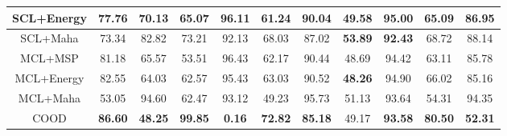 \begin{table*}[thb]
\begin{adjustbox}{width=0.9\textwidth}
\begin{tabular}{|ccccccccccc|}
\multicolumn{1}{|c|}{SCL+Energy}           & \multicolumn{1}{c|}{77.76}           & \multicolumn{1}{c|}{70.13}           & \multicolumn{1}{c|}{65.07}           & \multicolumn{1}{c|}{96.11}           & \multicolumn{1}{c|}{61.24}           & \multicolumn{1}{c|}{90.04}           & \multicolumn{1}{c|}{49.58}           & \multicolumn{1}{c|}{95.00}           & \multicolumn{1}{c|}{65.09}           & 86.95           \\ \hline
\multicolumn{1}{|c|}{SCL+Maha}             & \multicolumn{1}{c|}{73.34}           & \multicolumn{1}{c|}{82.82}           & \multicolumn{1}{c|}{73.21}           & \multicolumn{1}{c|}{92.13}           & \multicolumn{1}{c|}{68.03}           & \multicolumn{1}{c|}{87.02}           & \multicolumn{1}{c|}{\textbf{53.89}}  & \multicolumn{1}{c|}{\textbf{92.43}}  & \multicolumn{1}{c|}{68.72}           & 88.14           \\ \hline
\multicolumn{1}{|c|}{MCL+MSP}              & \multicolumn{1}{c|}{81.18}           & \multicolumn{1}{c|}{65.57}           & \multicolumn{1}{c|}{53.51}           & \multicolumn{1}{c|}{96.43}           & \multicolumn{1}{c|}{62.17}           & \multicolumn{1}{c|}{90.44}           & \multicolumn{1}{c|}{48.69}           & \multicolumn{1}{c|}{94.42}           & \multicolumn{1}{c|}{63.11}           & 85.78           \\ \hline
\multicolumn{1}{|c|}{MCL+Energy}           & \multicolumn{1}{c|}{82.55}           & \multicolumn{1}{c|}{64.03}           & \multicolumn{1}{c|}{62.57}           & \multicolumn{1}{c|}{95.43}           & \multicolumn{1}{c|}{63.03}           & \multicolumn{1}{c|}{90.52}           & \multicolumn{1}{c|}{\textbf{48.26}}  & \multicolumn{1}{c|}{94.90}           & \multicolumn{1}{c|}{66.02}           & 85.16           \\ \hline
\multicolumn{1}{|c|}{MCL+Maha}             & \multicolumn{1}{c|}{53.05}           & \multicolumn{1}{c|}{94.60}           & \multicolumn{1}{c|}{62.47}           & \multicolumn{1}{c|}{93.12}           & \multicolumn{1}{c|}{49.23}           & \multicolumn{1}{c|}{95.73}           & \multicolumn{1}{c|}{51.13}           & \multicolumn{1}{c|}{93.64}           & \multicolumn{1}{c|}{54.31}           & 94.35           \\ \hline
\multicolumn{1}{|c|}{COOD}                 & \multicolumn{1}{c|}{\textbf{86.60}}  & \multicolumn{1}{c|}{\textbf{48.25}}  & \multicolumn{1}{c|}{\textbf{99.85}}  & \multicolumn{1}{c|}{\textbf{0.16}}   & \multicolumn{1}{c|}{\textbf{72.82}}  & \multicolumn{1}{c|}{\textbf{85.18}}  & \multicolumn{1}{c|}{49.17}           & \multicolumn{1}{c|}{\textbf{93.58}}  & \multicolumn{1}{c|}{\textbf{80.50}}  & \textbf{52.31}  \\ \hline

\end{tabular}
\end{adjustbox}
\end{table*}
